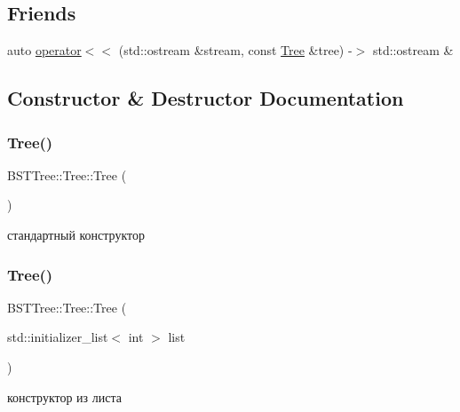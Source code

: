 \subsection*{Friends}
\begin{DoxyCompactItemize}
\item 
auto \mbox{\hyperlink{class_b_s_t_tree_1_1_tree_a4df8fc028c7dd645f2d9507fcc0fa407}{operator$<$$<$}} (std\+::ostream \&stream, const \mbox{\hyperlink{class_b_s_t_tree_1_1_tree}{Tree}} \&tree) -\/$>$ std\+::ostream \&
\end{DoxyCompactItemize}


\subsection{Constructor \& Destructor Documentation}
\mbox{\label{class_b_s_t_tree_1_1_tree_ab341ae8f5ea3eec3dd7eb2acb0126e8b}} 
\subsubsection{\texorpdfstring{Tree()}{Tree()}\hspace{0.1cm}{\footnotesize\ttfamily [1/4]}}
{\footnotesize\ttfamily B\+S\+T\+Tree\+::\+Tree\+::\+Tree (\begin{DoxyParamCaption}{ }\end{DoxyParamCaption})}

стандартный конструктор \mbox{\label{class_b_s_t_tree_1_1_tree_a425b43fb9301c18ac7241e173b05f7e0}} 
\subsubsection{\texorpdfstring{Tree()}{Tree()}\hspace{0.1cm}{\footnotesize\ttfamily [2/4]}}
{\footnotesize\ttfamily B\+S\+T\+Tree\+::\+Tree\+::\+Tree (\begin{DoxyParamCaption}\item[{std\+::initializer\+\_\+list$<$ int $>$}]{list }\end{DoxyParamCaption})}

конструктор из листа \mbox{\label{class_b_s_t_tree_1_1_tree_aa16db87e1a4e57addbbd8513f20150a5}} 
